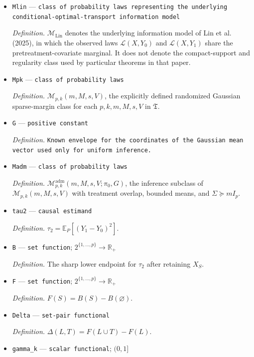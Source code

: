 \documentclass{article}
\begin{document}
\begin{itemize}
  \item \texttt{Mlin} --- \texttt{class of probability laws representing the underlying conditional-\allowbreak{}optimal-\allowbreak{}transport information model}
  \par\smallskip\noindent\emph{Definition.} \(\mathcal M_{\mathrm{Lin}}\) denotes the underlying information model of Lin et al. (2025), in which the observed laws \(\mathcal L(X,Y_0)\) and \(\mathcal L(X,Y_1)\) share the pretreatment-covariate marginal. It does not denote the compact-support and regularity class used by particular theorems in that paper.
  \item \texttt{Mpk} --- \texttt{class of probability laws}
  \par\smallskip\noindent\emph{Definition.} \(\mathcal M_{p,k}(m,M,s,V)\), the explicitly defined randomized Gaussian sparse-margin class for each \(p,k,m,M,s,V\) in \(\mathfrak T\).
  \item \texttt{G} --- \texttt{positive constant}
  \par\smallskip\noindent\emph{Definition.} \texttt{Known envelope for the coordinates of the Gaussian mean vector used only for uniform inference.}
  \item \texttt{Madm} --- \texttt{class of probability laws}
  \par\smallskip\noindent\emph{Definition.} \(\mathcal M^{\mathrm{adm}}_{p,k}(m,M,s,V;\pi_0,G)\), the inference subclass of \(\mathcal M_{p,k}(m,M,s,V)\) with treatment overlap, bounded means, and \(\Sigma\succeq mI_p\).
  \item \texttt{tau2} --- \texttt{causal estimand}
  \par\smallskip\noindent\emph{Definition.} \(\tau_2=\mathbb E_P[(Y_1-Y_0)^2]\).
  \item \texttt{B} --- \texttt{set function}; \(2^{\{1,\ldots,p\}}\to\mathbb R_+\)
  \par\smallskip\noindent\emph{Definition.} The sharp lower endpoint for \(\tau_2\) after retaining \(X_S\).
  \item \texttt{F} --- \texttt{set function}; \(2^{\{1,\ldots,p\}}\to\mathbb R_+\)
  \par\smallskip\noindent\emph{Definition.} \(F(S)=B(S)-B(\varnothing)\).
  \item \texttt{Delta} --- \texttt{set-\allowbreak{}pair functional}
  \par\smallskip\noindent\emph{Definition.} \(\Delta(L,T)=F(L\cup T)-F(L)\).
  \item \texttt{gamma\_\allowbreak{}k} --- \texttt{scalar functional}; \((0,1]\)

\end{itemize}
\end{document}
